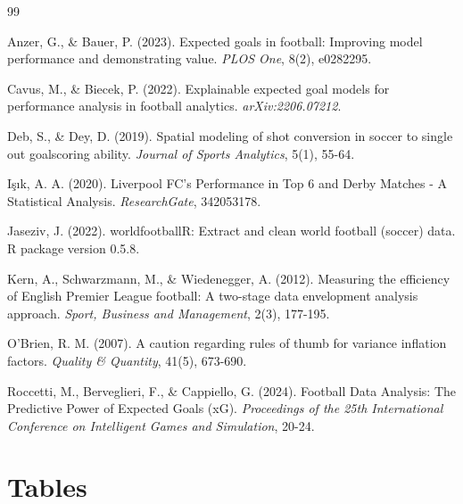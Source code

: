 \documentclass[12pt]{article}
\begin{document}
\clearpage

\begin{thebibliography}{99}

Anzer, G., \& Bauer, P. (2023). Expected goals in football: Improving model performance and demonstrating value. \textit{PLOS One}, 8(2), e0282295.

Cavus, M., \& Biecek, P. (2022). Explainable expected goal models for performance analysis in football analytics. \textit{arXiv:2206.07212}.

Deb, S., \& Dey, D. (2019). Spatial modeling of shot conversion in soccer to single out goalscoring ability. \textit{Journal of Sports Analytics}, 5(1), 55-64.

Işık, A. A. (2020). Liverpool FC's Performance in Top 6 and Derby Matches - A Statistical Analysis. \textit{ResearchGate}, 342053178.

Jaseziv, J. (2022). worldfootballR: Extract and clean world football (soccer) data. R package version 0.5.8.

Kern, A., Schwarzmann, M., \& Wiedenegger, A. (2012). Measuring the efficiency of English Premier League football: A two-stage data envelopment analysis approach. \textit{Sport, Business and Management}, 2(3), 177-195.

O'Brien, R. M. (2007). A caution regarding rules of thumb for variance inflation factors. \textit{Quality \& Quantity}, 41(5), 673-690.

Roccetti, M., Berveglieri, F., \& Cappiello, G. (2024). Football Data Analysis: The Predictive Power of Expected Goals (xG). \textit{Proceedings of the 25th International Conference on Intelligent Games and Simulation}, 20-24.

\end{thebibliography}

\clearpage
\section*{Tables}
\end{document}
